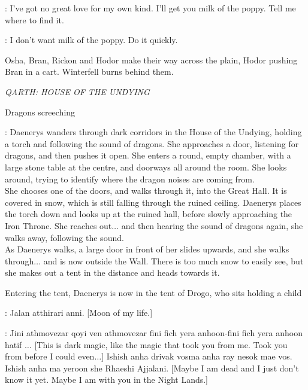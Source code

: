 \OSHA: I've got no great love for my own kind. I'll get you milk of the poppy. Tell me where to find it. 

\LUWIN: I don't want milk of the poppy.  Do it quickly. 


\n Osha, Bran, Rickon and Hodor make their way across the plain, Hodor pushing Bran in a cart. Winterfell burns behind them.


\scene

\textit{QARTH: HOUSE OF THE UNDYING} 

\sfx Dragons screeching


\NARRATOR: Daenerys wanders through dark corridors in the House of the Undying, holding a torch and following the sound of dragons. She approaches a door, listening for dragons, and then pushes it open. She enters a round, empty chamber, with a large stone table at the centre, and doorways all around the room. She looks around, trying to identify where the dragon noises are coming from.\\

She chooses one of the doors, and walks through it, into the Great Hall. It is covered in snow, which is still falling through the ruined ceiling. Daenerys places the torch down and looks up at the ruined hall, before slowly approaching the Iron Throne. She reaches out$\ldots$ and then hearing the sound of dragons again, she walks away, following the sound.\\

As Daenerys walks, a large door in front of her slides upwards, and she walks through$\ldots$ and is now outside the Wall. There is too much snow to easily see, but she makes out a tent in the distance and heads towards it. 

Entering the tent, Daenerys is now in the tent of Drogo, who sits holding a child

\DROGO: Jalan atthirari anni. [Moon of my life.] 


\DAENERYS: Jini athmovezar qoyi ven athmovezar fini fich yera anhoon-fini fich yera anhoon hatif $\ldots$ [This is dark magic, like the magic that took you from me. Took you from before I could even$\ldots$] Ishish anha drivak vosma anha ray nesok mae vos. Ishish anha ma yeroon she Rhaeshi Ajjalani. [Maybe I am dead and I just don't know it yet. Maybe I am with you in the Night Lands.] 

